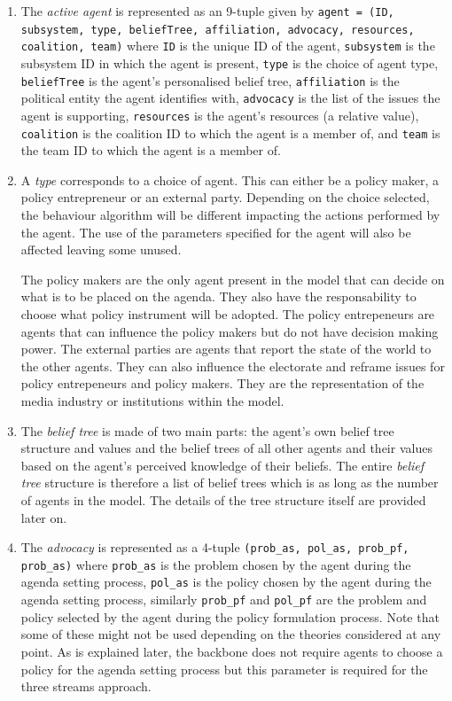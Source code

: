 \begin{enumerate}

\item The \emph{active agent} is represented as an 9-tuple given by \texttt{agent = (ID, subsystem, type, beliefTree, affiliation, advocacy, resources, coalition, team)} where
\texttt{ID} is the unique ID of the agent,
\texttt{subsystem} is the subsystem ID in which the agent is present,  
\texttt{type} is the choice of agent type, 
\texttt{beliefTree} is the agent's personalised belief tree, 
\texttt{affiliation} is the political entity the agent identifies with,  
\texttt{advocacy} is the list of the issues the agent is supporting, 
\texttt{resources} is the agent's resources (a relative value), 
\texttt{coalition} is the coalition ID to which the agent is a member of, and 
\texttt{team} is the team ID to which the agent is a member of.

\item A \emph{type} corresponds to a choice of agent. This can either be a policy maker, a policy entrepreneur or an external party. Depending on the choice selected, the behaviour algorithm will be different impacting the actions performed by the agent. The use of the parameters specified for the agent will also be affected leaving some unused. 

The policy makers are the only agent present in the model that can decide on what is to be placed on the agenda. They also have the responsability to choose what policy instrument will be adopted. The policy entrepeneurs are agents that can influence the policy makers but do not have decision making power. The external parties are agents that report the state of the world to the other agents. They can also influence the electorate and reframe issues for policy entrepeneurs and policy makers. They are the representation of the media industry or institutions within the model.

\item The \emph{belief tree} is made of two main parts: the agent's own belief tree structure and values and the belief trees of all other agents and their values based on the agent's perceived knowledge of their beliefs. The entire \emph{belief tree} structure is therefore a list of belief trees which is as long as the number of agents in the model. The details of the tree structure itself are provided later on.

\item The \emph{advocacy} is represented as a 4-tuple \texttt{(prob\_as, pol\_as, prob\_pf, prob\_as)} where \texttt{prob\_as} is the problem chosen by the agent during the agenda setting process, \texttt{pol\_as} is the policy chosen by the agent during the agenda setting process, similarly \texttt{prob\_pf} and \texttt{pol\_pf} are the problem and policy selected by the agent during the policy formulation process. Note that some of these might not be used depending on the theories considered at any point. As is explained later, the backbone does not require agents to choose a policy for the agenda setting process but this parameter is required for the three streams approach.


\end{enumerate}
